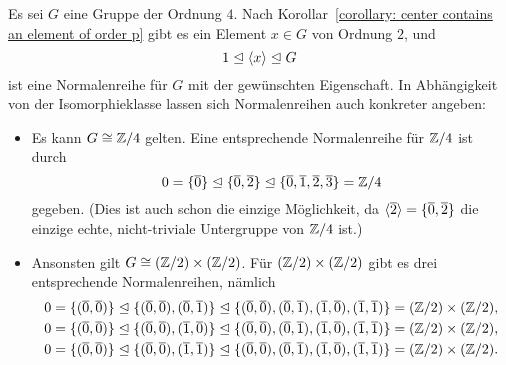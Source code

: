 Es sei $G$ eine Gruppe der Ordnung $4$.
Nach Korollar~\ref{corollary: center contains an element of order p} gibt es ein Element $x \in G$ von Ordnung $2$, und
\[
              1
  \trianglelefteq  \langle x\rangle
  \trianglelefteq  G
\]
ist eine Normalenreihe für $G$ mit der gewünschten Eigenschaft.
In Abhängigkeit von der Isomorphieklasse lassen sich Normalenreihen auch konkreter angeben:
\begin{itemize}
  \item
    Es kann $G \cong \mathbb{Z}/4$ gelten.
    Eine entsprechende Normalenreihe für $\mathbb{Z}/4$ ist durch
    \[
                  0
      =           \{ \overline{0} \}
      \trianglelefteq  \{ \overline{0}, \overline{2} \}
      \trianglelefteq  \{ \overline{0}, \overline{1}, \overline{2}, \overline{3} \}
      =           \mathbb{Z}/4
    \]
    gegeben.
    (Dies ist auch schon die einzige Möglichkeit, da $\langle \overline{2} \rangle = \{ \overline{0}, \overline{2} \}$ die einzige echte, nicht-triviale Untergruppe von $\mathbb{Z}/4$ ist.)
  \item
    Ansonsten gilt $G \cong (\mathbb{Z}/2) \times (\mathbb{Z}/2)$.
    Für $(\mathbb{Z}/2) \times (\mathbb{Z}/2)$ gibt es drei entsprechende Normalenreihen, nämlich
    \begin{gather*}
                  0
      =           \{ (\overline{0},\overline{0}) \}
      \trianglelefteq  \{ (\overline{0},\overline{0}), (\overline{0},\overline{1}) \}
      \trianglelefteq  \{ (\overline{0},\overline{0}), (\overline{0},\overline{1}), (\overline{1},\overline{0}), (\overline{1},\overline{1}) \}
      =           (\mathbb{Z}/2) \times (\mathbb{Z}/2),
      \\
                  0
      =           \{ (\overline{0},\overline{0}) \}
      \trianglelefteq  \{ (\overline{0},\overline{0}), (\overline{1},\overline{0}) \}
      \trianglelefteq  \{ (\overline{0},\overline{0}), (\overline{0},\overline{1}), (\overline{1},\overline{0}), (\overline{1},\overline{1}) \}
      =           (\mathbb{Z}/2) \times (\mathbb{Z}/2),
      \\
                  0
      =           \{ (\overline{0},\overline{0}) \}
      \trianglelefteq  \{ (\overline{0},\overline{0}), (\overline{1},\overline{1}) \}
      \trianglelefteq  \{ (\overline{0},\overline{0}), (\overline{0},\overline{1}), (\overline{1},\overline{0}), (\overline{1},\overline{1}) \}
      =           (\mathbb{Z}/2) \times (\mathbb{Z}/2).
    \end{gather*}
\end{itemize}





\addtocounter{subsection}{1}
